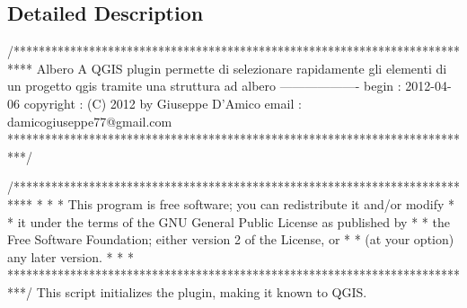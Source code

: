\subsection{Detailed Description}
\begin{DoxyVerb}
/***************************************************************************
 Albero
                                 A QGIS plugin
 permette di selezionare rapidamente gli elementi di un progetto qgis tramite una struttura ad albero
                             -------------------
        begin                : 2012-04-06
        copyright            : (C) 2012 by Giuseppe D'Amico
        email                : damicogiuseppe77@gmail.com
 ***************************************************************************/

/***************************************************************************
 *                                                                         *
 *   This program is free software; you can redistribute it and/or modify  *
 *   it under the terms of the GNU General Public License as published by  *
 *   the Free Software Foundation; either version 2 of the License, or     *
 *   (at your option) any later version.                                   *
 *                                                                         *
 ***************************************************************************/
 This script initializes the plugin, making it known to QGIS.
\end{DoxyVerb}
 


